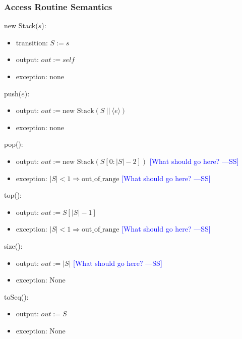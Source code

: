 \documentclass[12pt]{article}
\newcommand{\authornote}[3]{\textcolor{#1}{[#3 ---#2]}}
\newcommand{\authornote}[3]{}
\newcommand{\wss}[1]{\authornote{blue}{SS}{#1}}
\begin{document}
\subsubsection* {Access Routine Semantics}

new Stack($s$):
\begin{itemize}
\item transition: $S := s$

\item output: $\mathit{out} := \mathit{self}$
\item exception: none
\end{itemize}

\noindent push($e$):
\begin{itemize}
\item output: $out := \text{new Stack}(S\ ||\ \langle e \rangle)$
\item exception: none
\end{itemize}

\noindent pop():
\begin{itemize}
\item output: $out := \text{new Stack}(S[0 : |S|-2])$ 
\wss{What should go here?}

\item exception: $|S| < 1 \Rightarrow \text{out\_of\_range}$
\wss{What should go here?}

\end{itemize}

\noindent top():
\begin{itemize}
\item output: $\mathit{out} := S[|S| - 1]$

\item exception: $|S| < 1 \Rightarrow \text{out\_of\_range}$
\wss{What should go here?}

\end{itemize}

\noindent size():
\begin{itemize}
\item output: $\mathit{out} := |S|$
\wss{What should go here?}
\item exception: None
\end{itemize}

\noindent toSeq():
\begin{itemize}
\item output: $\mathit{out} := S$
\item exception: None

\end{itemize}
\end{document}
